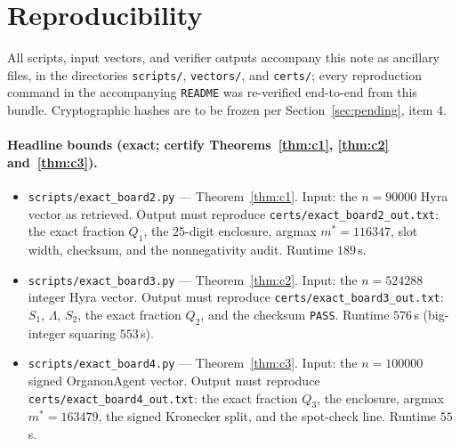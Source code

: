 \documentclass[11pt]{article}
\theoremstyle{remark}
\begin{document}
\appendix

\section{Reproducibility}\label{sec:repro}
\sloppy

All scripts, input vectors, and verifier outputs accompany this note as
ancillary files, in the directories \texttt{scripts/}, \texttt{vectors/}, and
\texttt{certs/}; every reproduction command in the accompanying
\texttt{README} was re-verified end-to-end from this bundle. Cryptographic
hashes are to be frozen per Section~\ref{sec:pending}, item 4.

\paragraph{Headline bounds (exact; certify
Theorems~\ref{thm:c1}, \ref{thm:c2} and~\ref{thm:c3}).}
\begin{itemize}
\item \texttt{scripts/exact\_board2.py} --- Theorem~\ref{thm:c1}. Input: the
$n = 90000$ Hyra vector as retrieved. Output must reproduce
\texttt{certs/exact\_board2\_out.txt}: the exact fraction $Q_1$, the
$25$-digit enclosure, argmax $m^\ast = 116347$, slot width, checksum, and
the nonnegativity audit. Runtime $189$\,s.
\item \texttt{scripts/exact\_board3.py} --- Theorem~\ref{thm:c2}. Input: the
$n = 524288$ integer Hyra vector. Output must reproduce
\texttt{certs/exact\_board3\_out.txt}: $S_1$, $\Lambda$, $S_2$, the exact
fraction $Q_2$, and the checksum \texttt{PASS}. Runtime $576$\,s (big-integer
squaring $553$\,s).
\item \texttt{scripts/exact\_board4.py} --- Theorem~\ref{thm:c3}. Input: the
$n = 100000$ signed OrganonAgent vector. Output must reproduce
\texttt{certs/exact\_board4\_out.txt}: the exact fraction $Q_3$, the
enclosure, argmax $m^\ast = 163479$, the signed Kronecker split, and the
spot-check line. Runtime $55$\,s.
\end{itemize}
\end{document}
